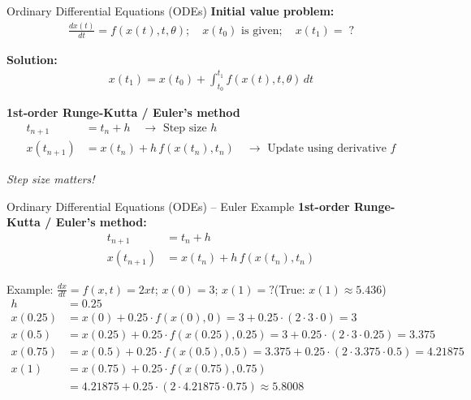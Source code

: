 \documentclass[aspectratio=169,xcolor=dvipsnames,svgnames,x11names,fleqn]{beamer}
\begin{document}
\begin{frame}{Ordinary Differential Equations (ODEs)}
  \textbf{Initial value problem:}
  \begin{align*}
    \frac{dx(t)}{dt} = f(x(t), t, \theta); \quad x(t_0) \text{ is given}; \quad x(t_1) = \;?
  \end{align*}
 
  \textbf{Solution:}
  \begin{align*}
    x(t_1) = x(t_0) + \int_{t_0}^{t_1} f(x(t), t, \theta)\, dt
  \end{align*}
 
  \begin{block}{\textbf{1st-order Runge-Kutta / Euler's method}}
    \begin{align*}
      t_{n+1} &= t_n + h \quad \longrightarrow \text{ Step size } h\\
      x(t_{n+1}) &= x(t_n) + h\,f(x(t_n), t_n) \quad \longrightarrow \text{ Update using derivative } f
    \end{align*}
  \end{block}
 
  \begin{center}
    \textit{Step size matters!}
  \end{center}
\end{frame}
 
 
\begin{frame}{Ordinary Differential Equations (ODEs) -- Euler Example}
  \textbf{1st-order Runge-Kutta / Euler's method:}
  \begin{align*}
    t_{n+1} &= t_n + h\\
    x(t_{n+1}) &= x(t_n) + h\,f(x(t_n), t_n)
  \end{align*}
 
  \begin{block}{Example: $\frac{dx}{dt} = f(x,t) = 2xt$; $x(0)=3$; $x(1)=?$\quad (True: $x(1) \approx 5.436$)}
    \small
    \begin{align*}
      h &= 0.25\\
      x(0.25) &= x(0) + 0.25 \cdot f(x(0),0) = 3 + 0.25\cdot(2\cdot3\cdot0) = 3\\
      x(0.5)  &= x(0.25) + 0.25\cdot f(x(0.25),0.25) = 3 + 0.25\cdot(2\cdot3\cdot0.25) = 3.375\\
      x(0.75) &= x(0.5) + 0.25\cdot f(x(0.5),0.5) = 3.375 + 0.25\cdot(2\cdot3.375\cdot0.5) = 4.21875\\
      x(1)    &= x(0.75) + 0.25\cdot f(x(0.75),0.75)\\
              &= 4.21875 + 0.25\cdot(2\cdot4.21875\cdot0.75) \approx 5.8008
    \end{align*}
  \end{block}
\end{frame}
 
\end{document}
